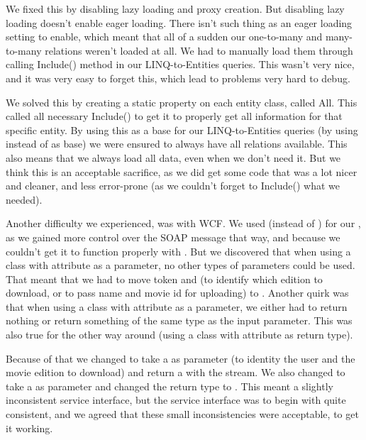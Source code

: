 We fixed this by disabling lazy loading and proxy creation. But disabling lazy loading doesn't enable eager loading. There isn't such thing as an eager loading setting to enable, which meant that all of a sudden our one-to-many and many-to-many relations weren't loaded at all. We had to manually load them through calling Include() method in our LINQ-to-Entities queries. This wasn't very nice, and it was very easy to forget this, which lead to problems very hard to debug.

We solved this by creating a static property on each entity class, called All. This called all necessary Include() to get it to properly get all information for that specific entity. By using this as a base for our LINQ-to-Entities queries (by using  instead of  as base) we were ensured to always have all relations available. This also means that we always load all data, even when we don't need it. But we think this is an acceptable sacrifice, as we did get some code that was a lot nicer and cleaner, and less error-prone (as we couldn't forget to Include() what we needed).

Another difficulty we experienced, was with WCF. We used  (instead of ) for our , as we gained more control over the SOAP message that way, and because we couldn't get it to function properly with . But we discovered that when using a class with  attribute as a parameter, no other types of parameters could be used. That meant that we had to move token and  (to identify which edition to download, or to pass name and movie id for uploading) to . Another quirk was that when using a class with  attribute as a parameter, we either had to return nothing or return something of the same type as the input parameter. This was also true for the other way around (using a class with  attribute as return type).

Because of that we changed  to take a   as parameter (to identity the user and the movie edition to download) and return a   with the stream. We also changed  to take a  as parameter and changed the return type to . This meant a slightly inconsistent service interface, but the service interface was to begin with quite consistent, and we agreed that these small inconsistencies were acceptable, to get it working.

